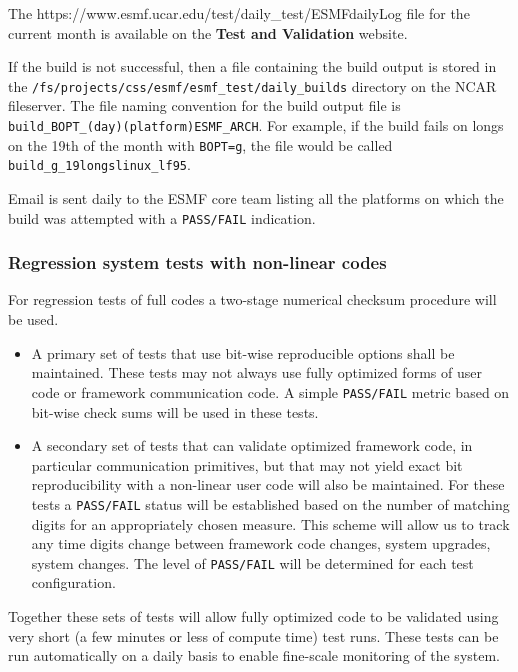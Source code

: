 The 
{https://www.esmf.ucar.edu/test/daily\_test/ESMFdailyLog} file for the current month is available on the {\bf Test and Validation} website.

If the build is not successful, then a file containing the build output is stored in 
the {\tt /fs/projects/css/esmf/esmf\_test/daily\_builds} directory on the NCAR fileserver. The file naming convention for the build output file is 
{\tt build\_BOPT\_(day)(platform)ESMF\_ARCH}. For example, if the build fails on longs on the 19th of the month with {\tt BOPT=g}, the file would be called {\tt build\_g\_19longslinux\_lf95}. 

Email is sent daily to the ESMF core team listing all the platforms on which the build was attempted with a {\tt PASS/FAIL} indication. 

\subsubsection{Regression system tests with non-linear codes}
 For regression tests of full codes a two-stage
numerical checksum procedure will be used.

\begin{itemize}
\item A primary set of tests that
use bit-wise reproducible options shall be
maintained. These tests may not always use fully optimized
forms of user code or framework communication code.
A simple {\tt PASS/FAIL} metric based on bit-wise
check sums will be used in these tests.

\item A secondary set of tests that can validate
optimized framework code, in particular communication primitives, but
that may not yield exact bit reproducibility
with a non-linear user code will also
be maintained. For these tests a {\tt PASS/FAIL}
status will be established based on the number of
matching digits for an appropriately chosen measure.
This scheme will allow us to track any time
digits change between framework code changes, system upgrades,
system changes. The level of {\tt PASS/FAIL} will be determined for
each test configuration.

\end{itemize}

Together these sets of tests will allow fully optimized code
to be validated using very short (a few minutes or less of compute time)
test runs. These tests can be run automatically on a daily basis
to enable fine-scale monitoring of the system.


